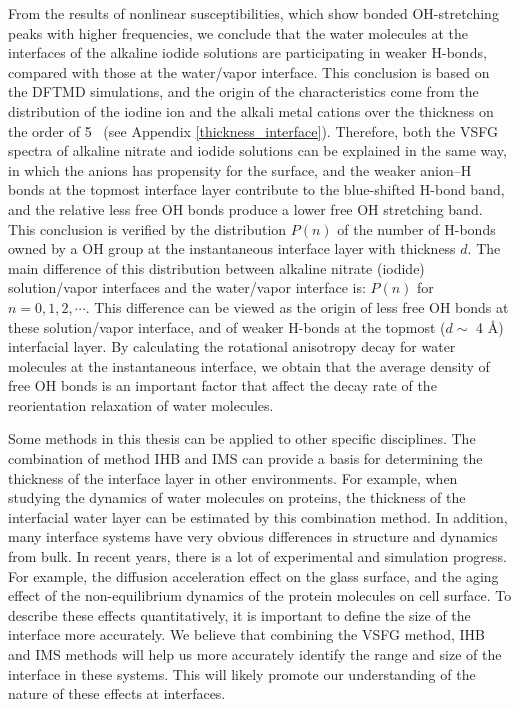 From the results of nonlinear susceptibilities, which show bonded OH-stretching peaks with higher frequencies, 
we conclude that the water molecules at the interfaces of the alkaline iodide solutions are participating 
in weaker H-bonds, compared with those at the water/vapor interface. 
This conclusion is based on the DFTMD simulations, and %
the origin of the characteristics come from the distribution of the iodine ion and the alkali metal cations
over the thickness on the order of 5 \A\ (see Appendix \ref{thickness_interface}).
Therefore, both the VSFG spectra of alkaline nitrate and iodide solutions can be explained in the same way, 
in which the anions has propensity for the surface, and the weaker anion--H bonds at the topmost interface layer contribute to the blue-shifted H-bond band,
and the relative less free OH bonds produce a lower free OH stretching band.
This conclusion is verified by the distribution $P(n)$ of the number of H-bonds owned by a OH group at the instantaneous interface layer with thickness $d$. 
The main difference of this distribution between alkaline nitrate (iodide) solution/vapor interfaces and the water/vapor interface is:
$P(n)$ for $n= 0, 1, 2,\cdots$. This difference can be viewed as the origin of less free OH bonds at these solution/vapor interface, 
and of weaker H-bonds at the topmost ($d \sim$ 4 \AA) interfacial layer.
By calculating the rotational anisotropy decay for water molecules at the instantaneous interface, 
we obtain that the average density of free OH bonds is an important factor that affect the decay rate of the reorientation relaxation of water molecules.


Some methods in this thesis can be applied to other specific disciplines.
The combination of method IHB and IMS can provide a basis for determining the thickness of the interface layer in other environments. 
For example, when studying the dynamics of water molecules on proteins, the thickness of the interfacial water layer can be estimated by this combination method.
In addition, many interface systems have very obvious differences in structure and dynamics from bulk.
In recent years, there is a lot of experimental and simulation progress. For example, the diffusion acceleration effect on the glass surface\cite{ZhuL11,ZhangWei16}, 
and the aging effect of the non-equilibrium dynamics of the protein molecules on cell surface\cite{HuXiaohu16}. 
To describe these effects quantitatively, it is important to define the size of the interface more accurately. 
We believe that combining the VSFG method, IHB and IMS methods will help us more accurately identify the range and size of the interface in these systems.
This will likely promote our understanding of the nature of these effects at interfaces.

